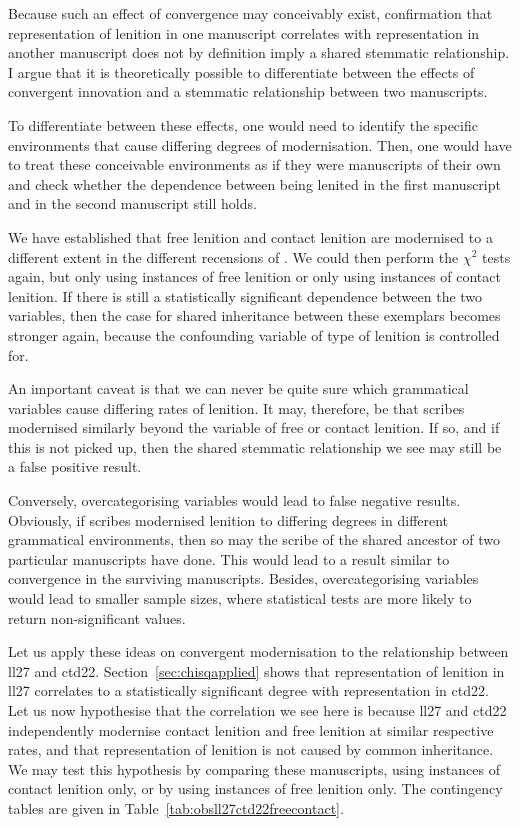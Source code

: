 Because such an effect of convergence may conceivably exist, confirmation that representation of lenition in one manuscript correlates with representation in another manuscript does not by definition imply a shared stemmatic relationship. I argue that it is theoretically possible to differentiate between the effects of convergent innovation and a stemmatic relationship between two manuscripts.

To differentiate between these effects, one would need to identify the specific environments that cause differing degrees of modernisation. Then, one would have to treat these conceivable environments as if they were manuscripts of their own and check whether the dependence between being lenited in the first manuscript and in the second manuscript still holds.

We have established that free lenition and contact lenition are modernised to a different extent in the different recensions of . We could then perform the \(\chi^2\) tests again, but only using instances of free lenition or only using instances of contact lenition. If there is still a statistically significant dependence between the two variables, then the case for shared inheritance between these exemplars becomes stronger again, because the confounding variable of type of lenition is controlled for.

An important caveat is that we can never be quite sure which grammatical variables cause differing rates of lenition. It may, therefore, be that scribes modernised similarly beyond the variable of free or contact lenition. If so, and if this is not picked up, then the shared stemmatic relationship we see may still be a false positive result.

Conversely, overcategorising variables would lead to false negative results. Obviously, if scribes modernised lenition to differing degrees in different grammatical environments, then so may the scribe of the shared ancestor of two particular manuscripts have done. This would lead to a result similar to convergence in the surviving manuscripts. Besides, overcategorising variables would lead to smaller sample sizes, where statistical tests are more likely to return non-significant values.

Let us apply these ideas on convergent modernisation to the relationship between \gls{ll27} and \gls{ctd22}. Section~\ref{sec:chisqapplied} shows that representation of lenition in \gls{ll27} correlates to a statistically significant degree with representation in \gls{ctd22}. Let us now hypothesise that the correlation we see here is because \gls{ll27} and \gls{ctd22} independently modernise contact lenition and free lenition at similar respective rates, and that representation of lenition is not caused by common inheritance. We may test this hypothesis by comparing these manuscripts, using instances of contact lenition only, or by using instances of free lenition only. The contingency tables are given in Table~\ref{tab:obsll27ctd22freecontact}.

